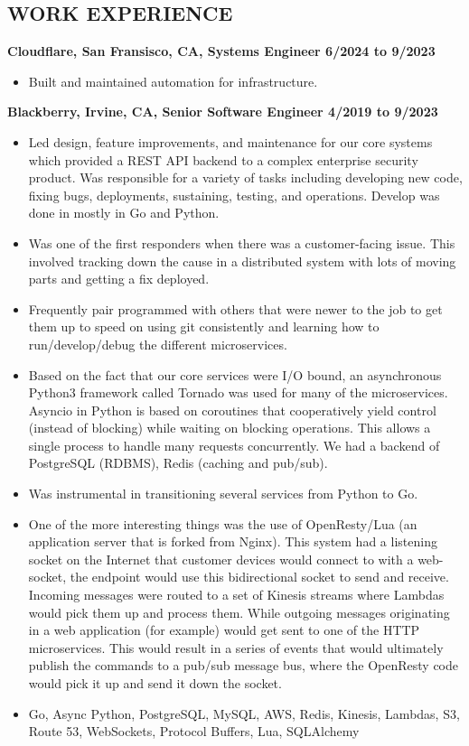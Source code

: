 \documentclass{res}
\begin{document}
\begin{resume}
\section{WORK EXPERIENCE}
  {\large \bf Cloudflare, San Fransisco, CA, Systems Engineer \hfill 6/2024 to 9/2023}
  \begin{itemize}
  \item
    Built and maintained automation for infrastructure.
  \end{itemize}
  {\large \bf Blackberry, Irvine, CA, Senior Software Engineer \hfill 4/2019 to 9/2023}
  \begin{itemize}
  \item
    Led design, feature improvements, and maintenance for our core
    systems which provided a REST API backend to a complex enterprise
    security product.  Was responsible for a variety of tasks including
    developing new code, fixing bugs, deployments, sustaining, testing,
    and operations.  Develop was done in mostly in Go and Python.
  \item
    Was one of the first responders when there was a customer-facing
    issue.  This involved tracking down the cause in a distributed system
    with lots of moving parts and getting a fix deployed.
  \item
    Frequently pair programmed with others that were newer to the job
    to get them up to speed on using git consistently and learning how
    to run/develop/debug the different microservices.
  \item
    Based on the fact that our core services were I/O bound, an
    asynchronous Python3 framework called Tornado was used for many of
    the microservices. Asyncio in Python is based on coroutines that
    cooperatively yield control (instead of blocking) while waiting on
    blocking operations. This allows a single process to handle many
    requests concurrently.  We had a backend of PostgreSQL (RDBMS),
    Redis (caching and pub/sub).
  \item
    Was instrumental in transitioning several services from Python to Go.
  \item
    One of the more interesting things was the use of OpenResty/Lua (an
    application server that is forked from Nginx).  This system had a
    listening socket on the Internet that customer devices would connect
    to with a web-socket, the endpoint would use this bidirectional
    socket to send and receive.  Incoming messages were routed to a set
    of Kinesis streams where Lambdas would pick them up and process them.
    While outgoing messages originating in a web application (for example)
    would get sent to one of  the HTTP microservices.  This would result
    in a series of events that would ultimately publish the commands
    to a pub/sub message bus, where the OpenResty code would pick it up
    and send it down the socket.
  \item
    Go, Async Python, PostgreSQL, MySQL, AWS, Redis, Kinesis,
    Lambdas, S3, Route 53, WebSockets, Protocol Buffers, Lua, SQLAlchemy
  \end{itemize}


\end{resume}
\end{document}
